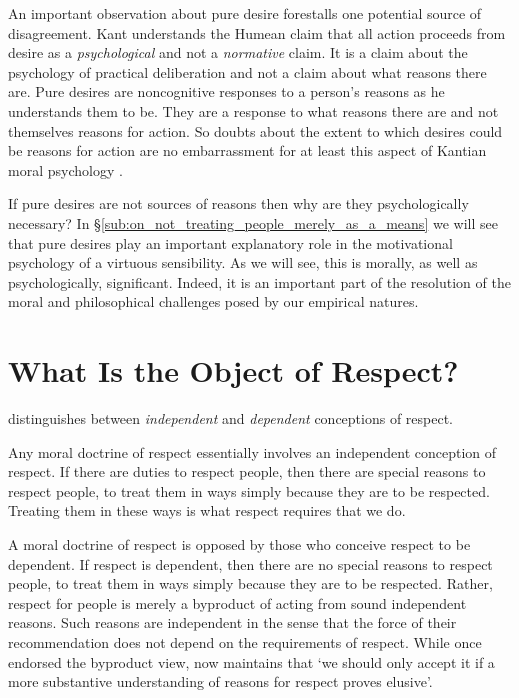 \documentclass[a4paper,12pt]{article}
\begin{document}
An important observation about pure desire forestalls one potential source of disagreement. Kant understands the Humean claim that all action proceeds from desire as a \emph{psychological} and not a \emph{normative} claim. It is a claim about the psychology of practical deliberation and not a claim about what reasons there are. Pure desires are noncognitive responses to a person's reasons as he understands them to be. They are a response to what reasons there are and not themselves reasons for action. So doubts about the extent to which desires could be reasons for action are no embarrassment for at least this aspect of Kantian moral psychology \citep[for such doubts see, inter alia,][]{Scanlon:1998hb, Raz:2000tm}. 

If pure desires are not sources of reasons then why are they psychologically necessary? In \S\ref{sub:on_not_treating_people_merely_as_a_means} we will see that pure desires play an important explanatory role in the motivational psychology of a virtuous sensibility. As we will see, this is morally, as well as psychologically, significant. Indeed, it is an important part of the resolution of the moral and philosophical challenges posed by our empirical natures.


\section{What Is the Object of Respect?} \label{sec:what_is_the_object_of_respect} %

\citet{Raz:2001ps,Raz:2002vn} distinguishes between \emph{independent} and \emph{dependent} conceptions of respect. 

Any moral doctrine of respect essentially involves an independent conception of respect. If there are duties to respect people, then there are special reasons to respect people, to treat them in ways simply because they are to be respected. Treating them in these ways is what respect requires that we do. 

A moral doctrine of respect is opposed by those who conceive respect to be dependent. If respect is dependent, then there are no special reasons to respect people, to treat them in ways simply because they are to be respected. Rather, respect for people is merely a byproduct of acting from sound independent reasons. Such reasons are independent in the sense that the force of their recommendation does not depend on the requirements of respect. While \citet{Raz:1986lq} once endorsed the byproduct view, \citet[127]{Raz:2001ps} now maintains that `we should only accept it if a more substantive understanding of reasons for respect proves elusive'. 
\end{document}
